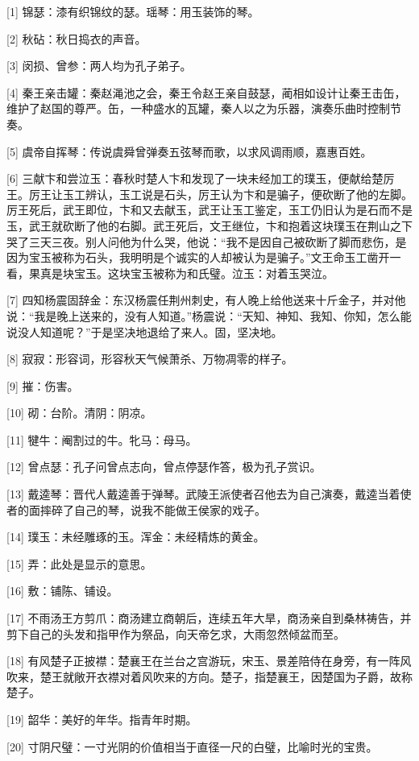 \documentclass[12pt,UTF8]{ctexbook}
\begin{document}
[1] 锦瑟：漆有织锦纹的瑟。瑶琴：用玉装饰的琴。

[2] 秋砧：秋日捣衣的声音。

[3] 闵损、曾参：两人均为孔子弟子。

[4] 秦王亲击罐：秦赵渑池之会，秦王令赵王亲自鼓瑟，蔺相如设计让秦王击缶，维护了赵国的尊严。缶，一种盛水的瓦罐，秦人以之为乐器，演奏乐曲时控制节奏。

[5] 虞帝自挥琴：传说虞舜曾弹奏五弦琴而歌，以求风调雨顺，嘉惠百姓。

[6] 三献卞和尝泣玉：春秋时楚人卞和发现了一块未经加工的璞玉，便献给楚厉王。厉王让玉工辨认，玉工说是石头，厉王认为卞和是骗子，便砍断了他的左脚。厉王死后，武王即位，卞和又去献玉，武王让玉工鉴定，玉工仍旧认为是石而不是玉，武王就砍断了他的右脚。武王死后，文王继位，卞和抱着这块璞玉在荆山之下哭了三天三夜。别人问他为什么哭，他说：“我不是因自己被砍断了脚而悲伤，是因为宝玉被称为石头，我明明是个诚实的人却被认为是骗子。”文王命玉工凿开一看，果真是块宝玉。这块宝玉被称为和氏璧。泣玉：对着玉哭泣。

[7] 四知杨震固辞金：东汉杨震任荆州刺史，有人晚上给他送来十斤金子，并对他说：“我是晚上送来的，没有人知道。”杨震说：“天知、神知、我知、你知，怎么能说没人知道呢？”于是坚决地退给了来人。固，坚决地。

[8] 寂寂：形容词，形容秋天气候萧杀、万物凋零的样子。

[9] 摧：伤害。

[10] 砌：台阶。清阴：阴凉。

[11] 犍牛：阉割过的牛。牝马：母马。

[12] 曾点瑟：孔子问曾点志向，曾点停瑟作答，极为孔子赏识。

[13] 戴逵琴：晋代人戴逵善于弹琴。武陵王派使者召他去为自己演奏，戴逵当着使者的面摔碎了自己的琴，说我不能做王侯家的戏子。

[14] 璞玉：未经雕琢的玉。浑金：未经精炼的黄金。

[15] 弄：此处是显示的意思。

[16] 敷：铺陈、铺设。

[17] 不雨汤王方剪爪：商汤建立商朝后，连续五年大旱，商汤亲自到桑林祷告，并剪下自己的头发和指甲作为祭品，向天帝乞求，大雨忽然倾盆而至。

[18] 有风楚子正披襟：楚襄王在兰台之宫游玩，宋玉、景差陪侍在身旁，有一阵风吹来，楚王就敞开衣襟对着风吹来的方向。楚子，指楚襄王，因楚国为子爵，故称楚子。

[19] 韶华：美好的年华。指青年时期。

[20] 寸阴尺璧：一寸光阴的价值相当于直径一尺的白璧，比喻时光的宝贵。
\end{document}
